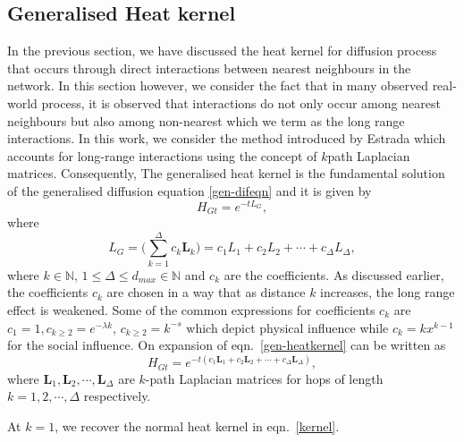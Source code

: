 \documentclass[10pt,a4paper]{article}
\begin{document}
        \subsection{Generalised Heat kernel}
        In the previous section, we have discussed the heat kernel for diffusion process that occurs through direct interactions between nearest neighbours in the network. In this section however, we consider the fact that in many observed real-world process, it is observed that interactions do not only occur among nearest neighbours but also among non-nearest which we term as the long range interactions. In this work, we consider the method introduced by Estrada \citep{estrada2012path} which accounts for long-range interactions using the concept of $k$path Laplacian matrices. Consequently, The generalised heat kernel is the fundamental solution of the generalised diffusion equation \ref{gen-difeqn} and it is given by 
        \begin{equation}
        H_{Gt} = e^{-t L_{G}},
        \end{equation}
        where
        \begin{equation}
        L_{G} =  \Big(\sum_{k=1}^{\Delta}c_k\mathbf{L}_{k} \Big) = c_{1}L_{1} + c_{2}L_{2} + \cdots + c_{\Delta}L_{\Delta}, 
        \label{gen-heatkernel}
        \end{equation}
        where $k\in \mathbb{N}$, $1 \leq \Delta \leq d_{max} \in \mathbb{N}$ and $c_k$ are the coefficients. As discussed earlier, 
        the coefficients $c_k$  are chosen in a way that as distance $k$ increases, the long range effect is weakened. Some of the common expressions for coefficients $c_k$ are $c_1 =1, c_{k\geq 2} = e^{-\lambda k}$, $ c_{k\geq 2} =k^{-s}$ which depict physical influence while $c_k = kx^{k-1}$ for the social influence.
        On expansion of eqn.~\ref{gen-heatkernel} can be written as 
        \begin{equation}
        H_{Gt} = e^{-t(c_{1}\mathbf{L}_{1} + c_{2}\mathbf{L}_{2} + \cdots + c_{\Delta}\mathbf{L}_{\Delta})},
        \label{heatkernel-hsope}
        \end{equation}
        where $\mathbf{L}_1, \mathbf{L}_2, \cdots, \mathbf{L}_{\Delta}$ are  $k$-path Laplacian matrices for hops of length $k=1,2,\cdots, \Delta$ respectively. 
        
        At $k=1$, we recover the normal heat kernel in eqn.~\ref{kernel}.
\end{document}
